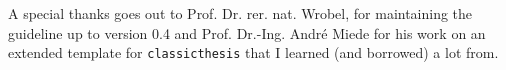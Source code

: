 A special thanks goes out to Prof. Dr. rer. nat. Wrobel, for maintaining the guideline up to version 0.4 and Prof. Dr.-Ing. André Miede for his work on an extended template for \texttt{classicthesis} that I learned (and borrowed) a lot from.


